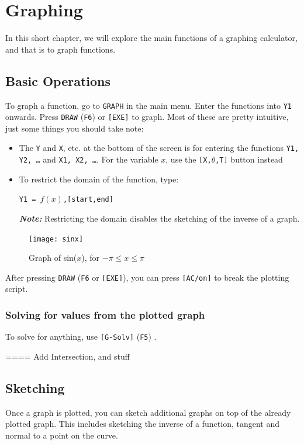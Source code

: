 \documentclass[a5paper]{memoir}
\def\code#1{\texttt{#1}}
\def\note#1{\textcolor[HTML]{109fa9}{\textbf{\textit{Note:}}} #1}
\def\Ffive{(\code{F5}) }
\def\Fsix{(\code{F6}) }
\begin{document}
\chapter{Graphing} \label{chap:graphing}

In this short chapter, we will explore the main functions of a graphing calculator, and that is to graph functions.

\section{Basic Operations}
To graph a function, go to \code{GRAPH} in the main menu. Enter the functions into \code{Y1} onwards. Press \code{DRAW} \Fsix or \code{[EXE]} to graph. Most of these are pretty intuitive, just some things you should take note:
\begin{itemize}
	\item The \code{Y} and \code{X}, etc. at the bottom of the screen is for entering the functions \code{Y1, Y2, \dots} and \code{X1, X2, \dots}. For the variable $x$, use the \code{[X,$\theta$,T]} button instead
	\item To restrict the domain of the function, type:
	\begin{center}
		\code{Y1 = $f(x)$,[start,end]}
	\end{center}
	\note{Restricting the domain disables the sketching of the inverse of a graph.}
\end{itemize}

\begin{figure}[h]
	\centering
	\texttt{[image: sinx]}
	\caption{Graph of sin($x$), for $-\pi \leq x \leq \pi$}
\end{figure}

After pressing \code{DRAW} (\code{F6} or \code{[EXE]}), you can press \code{[AC/on]} to break the plotting script.

\subsection{Solving for values from the plotted graph}

To solve for anything, use \code{[G-Solv]} \Ffive.

==== Add Intersection, and stuff

\section{Sketching}
Once a graph is plotted, you can sketch additional graphs on top of the already plotted graph. This includes sketching the inverse of a function, tangent and normal to a point on the curve.
\end{document}
